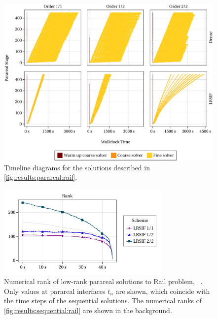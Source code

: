 \begin{figure}[tp]
  \includegraphics[width=\textwidth]{figures/fig_timeline_all.pdf}
  \caption[Timeline diagrams for parareal method applied to Rail problem]{%
    Timeline diagrams for the solutions described in \autoref{fig:results:parareal:rail}.
  }
  \label{fig:results:parareal:timeline}
\end{figure}

\begin{figure}[t]
  \centering
  \includegraphics[width=0.75\textwidth]{figures/fig_results_parareal_rank.pdf}
  \caption[Numerical rank of low-rank parareal solutions to Rail problem]{%
    Numerical rank of low-rank parareal solutions to Rail problem,
    \cf~\cite[Figure~6.6b]{Lang2017}.
    Only values at parareal interfaces $t_n$ are shown,
    which coincide with the time steps of the sequential solutions.
    The numerical ranks of \autoref{fig:results:sequential:rail} are shown in the background.
  }
\end{figure}


